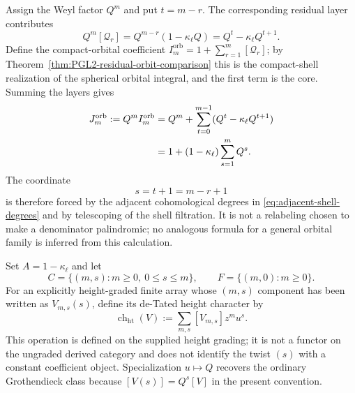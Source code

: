 \documentclass[11pt]{article}
\theoremstyle{definition}
\theoremstyle{remark}
\newcommand{\kappaell}{\kappa_{\ell}}
\begin{document}
Assign the Weyl factor $Q^m$ and put $t=m-r$.  The corresponding residual
layer contributes
\begin{equation}
 Q^m[\mathscr Q_r]
 =Q^{m-r}(1-\kappaell Q)
 =Q^t-\kappaell Q^{t+1}.
 \label{eq:adjacent-shell-degrees}
\end{equation}
Define the compact-orbital coefficient
$I_m^{\mathrm{orb}}=1+\sum_{r=1}^m[\mathscr Q_r]$; by
Theorem~\ref{thm:PGL2-residual-orbit-comparison} this is the compact-shell
realization of the spherical orbital integral, and the first term is the
core.  Summing the layers gives
\begin{align}
 J_m^{\mathrm{orb}}:=Q^m I_m^{\mathrm{orb}}
 &=Q^m+\sum_{t=0}^{m-1}(Q^t-\kappaell Q^{t+1})
 \notag\\
 &=1+(1-\kappaell)\sum_{s=1}^{m}Q^s.
 \label{eq:shell-telescoping}
\end{align}
The coordinate
\begin{equation}
 \boxed{s=t+1=m-r+1}
 \label{eq:canonical-translation-residual}
\end{equation}
is therefore forced by the adjacent cohomological degrees in
\eqref{eq:adjacent-shell-degrees} and by telescoping of the shell filtration.
It is not a relabeling chosen to make a denominator palindromic; no analogous
formula for a general orbital family is inferred from this calculation.

Set $A=1-\kappaell$ and let
\[
 C=\{(m,s):m\ge0,\ 0\le s\le m\},
 \qquad F=\{(m,0):m\ge0\}.
\]
For an explicitly height-graded finite array whose $(m,s)$ component has been
written as $V_{m,s}(s)$, define its de-Tated height character by
\begin{equation}
 \operatorname{ch}_{\mathrm{ht}}(V)
 :=\sum_{m,s}[V_{m,s}]z^mu^s.
 \label{eq:height-character-definition}
\end{equation}
This operation is defined on the supplied height grading; it is not a functor
on the ungraded derived category and does not identify the twist $(s)$ with a
constant coefficient object.  Specialization $u\mapsto Q$ recovers the
ordinary Grothendieck class because $[V(s)]=Q^s[V]$ in the present convention.
\end{document}
